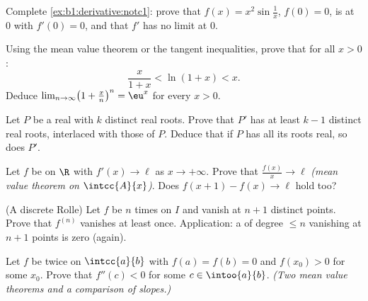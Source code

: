 \begin{exercise}[$\star$]\label{exo:b1:derivative:2}
Complete \cref{ex:b1:derivative:notc1}: prove that $f(x) = x^2
\sin\frac1x$, $f(0) = 0$, is  at $0$ with $f'(0) = 0$,
and that $f'$ has no limit at $0$.
\end{exercise}

\begin{exercise}[$\star$]\label{exo:b1:derivative:3}
Using the mean value theorem or the tangent inequalities, prove that
for all $x > 0$:
\[
\frac{x}{1 + x} < \ln(1 + x) < x .
\]
Deduce $\lim_{n\to\infty} \bigl(1 + \frac xn\bigr)^n = \eu^x$ for
every $x > 0$.
\end{exercise}

\begin{exercise}[$\star$]\label{exo:b1:derivative:4}
Let $P$ be a real  with $k$ distinct real roots. Prove that
$P'$ has at least $k - 1$ distinct real roots, interlaced with those
of $P$. Deduce that if $P$ has all its roots real, so does $P'$.
\end{exercise}

\begin{exercise}[$\star\star$]\label{exo:b1:derivative:5}
Let $f$ be  on $\R$ with $f' (x)\to \ell$ as $x \to
+\infty$. Prove that $\frac{f(x)}{x} \to \ell$ \emph{(mean value
theorem on $\intcc{A}{x}$)}. Does $f(x+1) - f(x) \to \ell$ hold too?
\end{exercise}

\begin{exercise}[$\star\star$]\label{exo:b1:derivative:6}
(A discrete Rolle) Let $f$ be $n$ times  on $I$ and
vanish at $n + 1$ distinct points. Prove that $f^{(n)}$ vanishes at
least once. Application: a  of degree $\leq n$ vanishing at
$n+1$ points is zero (again).
\end{exercise}

\begin{exercise}[$\star\star$]\label{exo:b1:derivative:7}
Let $f$ be twice  on $\intcc{a}{b}$ with $f(a) = f(b)
= 0$ and $f(x_0) > 0$ for some  $x_0$. Prove that $f''(c) <
0$ for some $c \in \intoo{a}{b}$. \emph{(Two mean value theorems and
a comparison of slopes.)}
\end{exercise}

